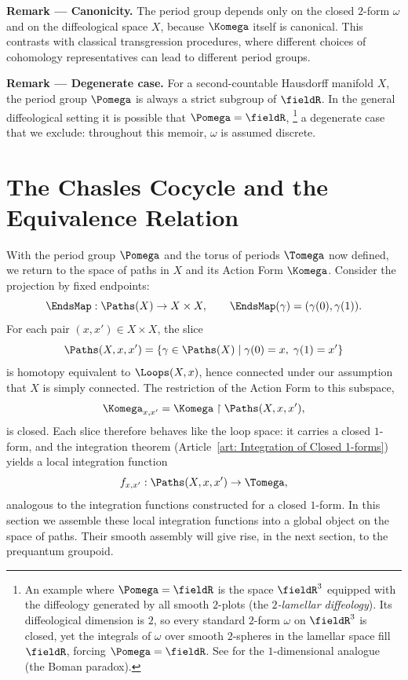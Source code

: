 \begin{article}
  \textbf{Remark --- Canonicity.}
  The period group depends only on the closed $2$-form $\omega$ and on the diffeological space $X$,
  because $\Komega$ itself is canonical.
  This contrasts with classical transgression procedures,
  where different choices of cohomology representatives can lead to different period groups.
  
  \textbf{Remark --- Degenerate case.}
  For a second-countable Hausdorff manifold $X$,
  the period group $\Pomega$ is always a strict subgroup of $\fieldR$.
  In the general diffeological setting it is possible that
  $\Pomega = \fieldR$,%
  \footnote{An example where $\Pomega = \fieldR$ is the space $\fieldR^3$
  equipped with the diffeology generated by all smooth $2$-plots
  (the \emph{$2$-lamellar diffeology}).
  Its diffeological dimension is $2$,
  so every standard $2$-form $\omega$ on $\fieldR^3$ is closed,
  yet the integrals of $\omega$ over smooth $2$-spheres in the
  lamellar space fill $\fieldR$,
  forcing $\Pomega = \fieldR$.
  See \cite{PIZ25c} for the $1$-dimensional analogue
  (the Boman paradox).}
  a degenerate case that we exclude:
  throughout this memoir,
  $\omega$ is assumed discrete.
\end{article}

\section{The Chasles Cocycle and the Equivalence Relation}
\label{sec:The Chasles Cocycle and the Equivalence Relation}

With the period group $\Pomega$ and the torus of periods $\Tomega$ now defined,
we return to the space of paths in $X$ and its Action Form $\Komega$.
Consider the projection by fixed endpoints:
\[
  \EndsMap: \Paths(X) \to X \times X,
  \qquad
  \EndsMap(\gamma) = (\gamma(0),\gamma(1)).
  \]%
For each pair $(x,x') \in X \times X$,
the slice
\[
  \Paths(X,x,x') = \{ \gamma \in \Paths(X) \mid \gamma(0) = x,\; \gamma(1) = x' \}
  \]%
is homotopy equivalent to $\Loops(X,x)$,
hence connected under our assumption that $X$ is simply connected.
The restriction of the Action Form to this subspace,
\[
  \Komega_{x,x'} = \Komega \restriction \Paths(X,x,x'),
  \]%
is closed.
Each slice therefore behaves like the loop space:
it carries a closed $1$-form,
and the integration theorem
(Article~\ref{art: Integration of Closed 1-forms})
yields a local integration function
\[
  f_{x,x'}: \Paths(X,x,x') \to \Tomega,
  \]%
analogous to the integration functions constructed for a closed $1$-form.
In this section we assemble these local integration functions
into a global object on the space of paths.
Their smooth assembly will give rise,
in the next section,
to the prequantum groupoid.

